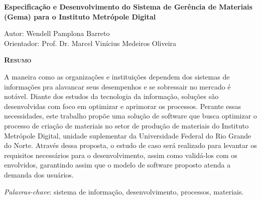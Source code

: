 \begin{center}
	{\Large{\textbf{Especificação e Desenvolvimento do Sistema de Gerência de Materiais (Gema) para o Instituto Metrópole Digital}}}
\end{center}

\vspace{1cm}

\begin{flushright}
	Autor: Wendell Pamplona Barreto\\
	Orientador: Prof. Dr. Marcel Vinícius Medeiros Oliveira
\end{flushright}

\vspace{1cm}

\begin{center}
	\Large{\textsc{\textbf{Resumo}}}
\end{center}

\noindent A maneira como as organizações e instituições dependem dos sistemas de informações pra alavancar seus desempenhos e se sobressair no mercado é notável. Diante dos estudos da tecnologia da informação, soluções são desenvolvidas com foco em optimizar e aprimorar os processos. Perante essas necessidades, este trabalho propõe uma solução de software que busca optimizar o processo de criação de materiais no setor de produção de materiais do Instituto Metrópole Digital, unidade suplementar da Universidade Federal do Rio Grande do Norte. Através dessa proposta, o estudo de caso será realizado para levantar os requisitos necessários para o desenvolvimento, assim como validá-los com os envolvidos, garantindo assim que o modelo de software proposto atenda a demanda dos usuários. 

\noindent\textit{Palavras-chave}: sistema de informação, desenvolvimento, processos, materiais.